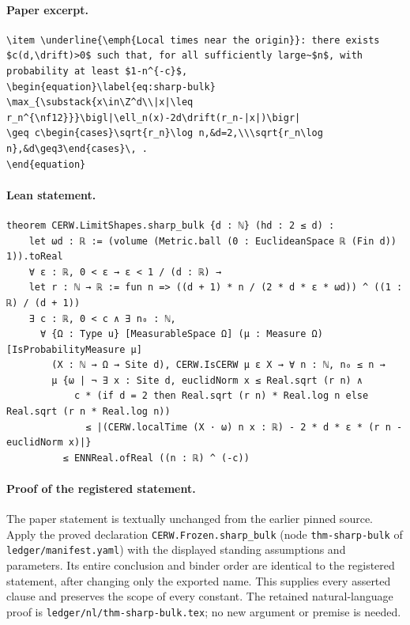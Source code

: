 \paragraph{Paper excerpt.}
\begin{verbatim}
\item \underline{\emph{Local times near the origin}}: there exists $c(d,\drift)>0$ such that, for all sufficiently large~$n$, with probability at least $1-n^{-c}$,
\begin{equation}\label{eq:sharp-bulk}
\max_{\substack{x\in\Z^d\\|x|\leq r_n^{\nf12}}}\bigl|\ell_n(x)-2d\drift(r_n-|x|)\bigr|
\geq c\begin{cases}\sqrt{r_n}\log n,&d=2,\\\sqrt{r_n\log n},&d\geq3\end{cases}\, .
\end{equation}
\end{verbatim}
\paragraph{Lean statement.}
\begin{verbatim}
theorem CERW.LimitShapes.sharp_bulk {d : ℕ} (hd : 2 ≤ d) :
    let ωd : ℝ := (volume (Metric.ball (0 : EuclideanSpace ℝ (Fin d)) 1)).toReal
    ∀ ε : ℝ, 0 < ε → ε < 1 / (d : ℝ) →
    let r : ℕ → ℝ := fun n => ((d + 1) * n / (2 * d * ε * ωd)) ^ ((1 : ℝ) / (d + 1))
    ∃ c : ℝ, 0 < c ∧ ∃ n₀ : ℕ,
      ∀ {Ω : Type u} [MeasurableSpace Ω] (μ : Measure Ω) [IsProbabilityMeasure μ]
        (X : ℕ → Ω → Site d), CERW.IsCERW μ ε X → ∀ n : ℕ, n₀ ≤ n →
        μ {ω | ¬ ∃ x : Site d, euclidNorm x ≤ Real.sqrt (r n) ∧
            c * (if d = 2 then Real.sqrt (r n) * Real.log n else Real.sqrt (r n * Real.log n))
              ≤ |(CERW.localTime (X · ω) n x : ℝ) - 2 * d * ε * (r n - euclidNorm x)|}
          ≤ ENNReal.ofReal ((n : ℝ) ^ (-c))
\end{verbatim}
\paragraph{Proof of the registered statement.}
The paper statement is textually unchanged from the earlier pinned source.
Apply the proved declaration \texttt{CERW.Frozen.sharp\_bulk}
(node \texttt{thm-sharp-bulk} of \texttt{ledger/manifest.yaml}) with the displayed
standing assumptions and parameters. Its entire conclusion and binder order
are identical to the registered statement, after changing only the exported
name. This supplies every asserted clause and preserves the scope of every
constant. The retained natural-language proof is
\texttt{ledger/nl/thm-sharp-bulk.tex}; no new argument or premise is needed.

